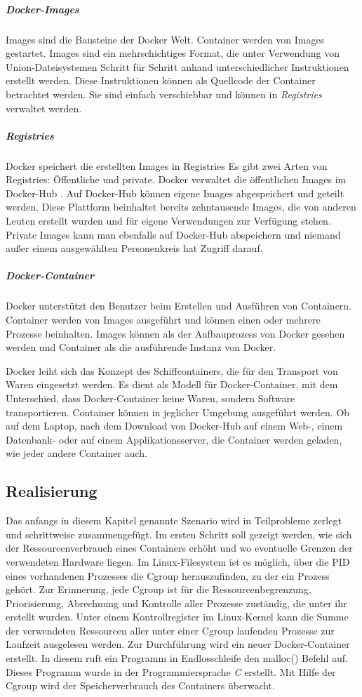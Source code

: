 \subparagraph{Docker-Images}
Images sind die Bausteine der Docker Welt. Container werden von Images gestartet. Images sind ein mehrschichtiges Format, die unter Verwendung von Union-Dateisystemen Schritt für Schritt anhand unterschiedlicher Instruktionen erstellt werden. Diese Instruktionen können als Quellcode der Container betrachtet werden. Sie sind einfach verschiebbar und können in \emph{Registries} verwaltet werden.

\subparagraph{Registries}
Docker speichert die erstellten Images in Registries Es gibt zwei Arten von Registries: Öffentliche und private. Docker verwaltet die öffentlichen Images im Docker-Hub \cite{DockerInc.2016DockerHub}. Auf Docker-Hub können eigene Images abgespeichert und geteilt werden. Diese Plattform beinhaltet bereits zehntausende Images, die von anderen Leuten erstellt wurden und für eigene Verwendungen zur Verfügung stehen. Private Images kann man ebenfalls auf Docker-Hub abspeichern und niemand außer einem ausgewählten Personenkreis hat Zugriff darauf.

\subparagraph{Docker-Container}
Docker unterstützt den Benutzer beim Erstellen und Ausführen von Containern. Container werden von Images ausgeführt und können einen oder mehrere Prozesse beinhalten. Images können als der Aufbauprozess von Docker gesehen werden und Container als die ausführende Instanz von Docker.

Docker leiht sich das Konzept des Schiffcontainers, die für den Transport von Waren eingesetzt werden. Es dient als Modell für Docker-Container, mit dem Unterschied, dass Docker-Container keine Waren, sondern Software transportieren. Container können in jeglicher Umgebung ausgeführt werden. Ob auf dem Laptop, nach dem Download von Docker-Hub auf einem Web-, einem Datenbank- oder auf einem Applikationsserver, die Container werden geladen, wie jeder andere Container auch.

\subsection{Realisierung}
Das anfangs in diesem Kapitel genannte Szenario wird in Teilprobleme zerlegt und schrittweise zusammengefügt. Im ersten Schritt soll gezeigt werden, wie sich der Ressourcenverbrauch eines Containers erhöht und wo eventuelle Grenzen der verwendeten Hardware liegen. Im Linux-Filesystem ist es möglich, über die PID eines vorhandenen Prozesses die Cgroup herauszufinden, zu der ein Prozess gehört. Zur Erinnerung, jede Cgroup ist für die Ressourcenbegrenzung, Priorisierung, Abrechnung und Kontrolle aller Prozesse zuständig, die unter ihr erstellt wurden. Unter einem Kontrollregister im Linux-Kernel kann die Summe der verwendeten Ressourcen aller unter einer Cgroup laufenden Prozesse zur Laufzeit ausgelesen werden. Zur Durchführung wird ein neuer Docker-Container erstellt. In diesem ruft ein Programm in Endlosschleife den malloc() Befehl auf. Dieses Programm wurde in der Programmiersprache \emph{C} erstellt. Mit Hilfe der Cgroup wird der Speicherverbrauch des Containers überwacht.

